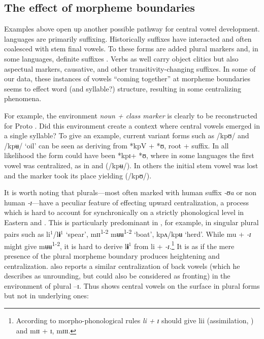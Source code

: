 \documentclass[output=paper,newtxmath,modfonts,nonflat,draft]{langsci/langscibook}
\begin{document}
\subsection{The effect of morpheme boundaries}\label{sec:zogbo:4.3} 

Examples above open up another possible pathway for central vowel development.  languages are primarily suffixing.  Historically  suffixes have interacted and often coalesced with stem final vowels. To these forms are added plural markers and, in some languages, definite suffixes \citep{Marchese1979/1983,Zogbo2017}.  Verbs as well carry object clitics but also aspectual markers, causative, and other transitivity-changing suffixes. In some of our data, these instances of vowels “coming together” at morpheme boundaries seems to effect word (and syllable?) structure, resulting in some centralizing phenomena. 

For example, the environment \textit{noun + class marker} is clearly to be reconstructed for Proto .  Did this environment create a context where central vowels emerged in a single syllable?  To give an example, current variant forms such as /kpʊ/ and /kpʉ/ ‘oil’ can be seen as deriving from *kpV + *ʊ, root +  suffix. In all likelihood the form could have been *kpɪ+ *ʊ, where in some languages the first vowel was centralized, as in  and  (/kpʉ/). In others the initial stem vowel was lost and the  marker took its place yielding (/kpʊ/).

It is worth noting that  plurals—most often marked with human suffix \textit{{}-ʊa} or non human \textit{{}-ɪ}—have a peculiar feature of effecting upward centralization, a process which is hard to account for synchronically on a strictly phonological level in Eastern  and  \citep{Marchese1979/1983}. This is particularly predominant in , for example, in singular plural pairs such as li$^1$/l\textbf{ɨ}$^1$ ‘spear’, mɪɪ\textsuperscript{1-2} mʉʉ\textsuperscript{1-2} ‘boat’, kpʌ/kpʉ ‘herd’.  While mu + \textit{{}-ɪ} might give mʉʉ\textsuperscript{1-2}, it is hard to derive l\textbf{ɨ}$^1$ from li + \textit{{}-ɪ}.\footnote{According to morpho-phonological rules \textit{li + ɪ} should give lii (assimilation, ) and mɪɪ + ɪ, mɪɪɪ.} It is as if the mere presence of the plural morpheme boundary produces heightening and centralization. \citet{Goprou2014} also reports a similar centralization of back vowels (which he describes as unrounding, but could also be considered as fronting) in the environment of plural –ɪ. Thus  shows central vowels on the surface in plural forms but not in underlying ones:
\end{document}
